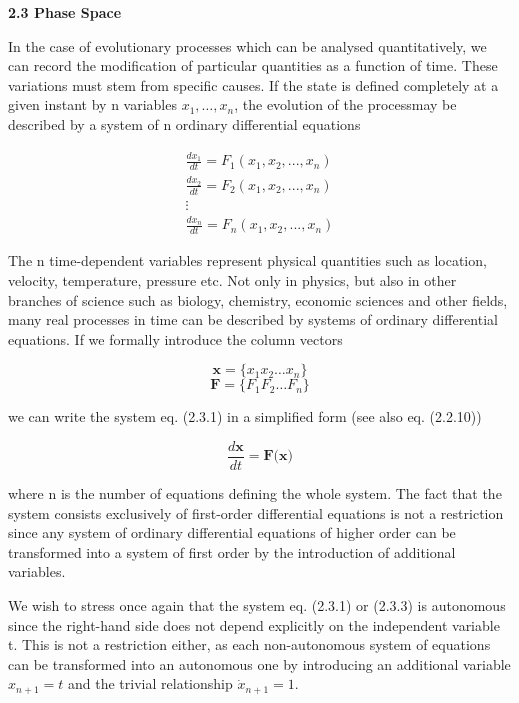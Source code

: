 \documentclass[12pt]{article}
\begin{document}
\hfill

\textbf{2.3 Phase Space}

\hfill

In the case of evolutionary processes which can be analysed quantitatively, we
can record the modification of particular quantities as a function of time. These
variations must stem from specific causes. If the state is defined completely at a
given instant by n variables $x_1, … , x_n$, the evolution of the processmay be described
by a system of n ordinary differential equations

\[
\begin{matrix}
\frac{dx_1}{dt} = F_1(x_1, x_2, ... , x_n) \\
\frac{dx_2}{dt} = F_2(x_1, x_2, ... , x_n) \\
\vdots \\
\frac{dx_n}{dt} = F_n(x_1, x_2, ... , x_n)
\end{matrix}
\]


The n time-dependent variables represent physical quantities such as location, velocity,
temperature, pressure etc. Not only in physics, but also in other branches
of science such as biology, chemistry, economic sciences and other fields, many real
processes in time can be described by systems of ordinary differential equations. If
we formally introduce the column vectors

\[
\textbf{x} = \{ x_1 x_2 …  x_n \}
\]
\[
\textbf{F} = \{F_1 F_2 …  F_n \} 
\]

we can write the system eq. (2.3.1) in a simplified form (see also eq. (2.2.10))

\[
\frac{d \textbf{x}}{dt} = \textbf{F(x)}
\]

where n is the number of equations defining the whole system. The fact that the
system consists exclusively of first-order differential equations is not a restriction
since any system of ordinary differential equations of higher order can be transformed
into a system of first order by the introduction of additional variables.

\hfill

We wish to stress once again that the system eq. (2.3.1) or (2.3.3) is autonomous
since the right-hand side does not depend explicitly on the independent variable t.
This is not a restriction either, as each non-autonomous system of equations can be
transformed into an autonomous one by introducing an additional variable $x_{n+1} = t$
and the trivial relationship $\dot{x}_{ n+1} = 1$.

\hfill
\end{document}
